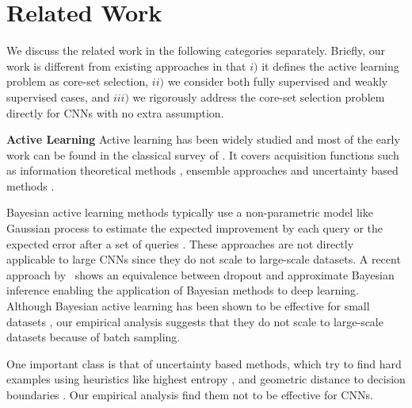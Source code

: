 \documentclass{article} \usepackage{iclr2018_conference,times}
\begin{document}
\section{Related Work} We discuss the related work in the following categories
separately. Briefly, our work is different from existing approaches in that $i)$
it defines the active learning problem as core-set selection, $ii)$ we consider
both fully supervised and weakly supervised cases, and $ iii)$ we rigorously
address the core-set selection problem directly for CNNs with no extra
assumption. 


\noindent\textbf{Active Learning} Active learning has been widely studied and
most of the early work can be found in the classical survey
of \citet{settles2010active}. It covers acquisition functions such as
information theoretical methods \citep{mackay1992information}, ensemble
approaches \citep{mccallumzy1998employing, freund1997selective} and uncertainty
based methods
\citep{tong2001support,joshi2009multi,li2013adaptive}.

Bayesian active learning methods typically use a non-parametric model like
Gaussian process to estimate the expected improvement by each query
\citep{kapoor2007active} or the expected error after a set of queries
\citep{roy2001toward}. These approaches are not directly applicable to large CNNs since they do not scale to large-scale datasets. A recent approach by~\citet{gal_bayes} shows an equivalence between dropout and approximate
Bayesian inference enabling the application of Bayesian methods to deep
learning. Although Bayesian active learning has been shown to be effective
for small datasets \citep{gal_active}, our empirical analysis suggests that they do not scale to large-scale datasets because of batch sampling.

One important class is that of uncertainty based methods, which try to find hard
examples using heuristics like highest entropy \citep{joshi2009multi}, and
geometric distance to decision boundaries
\citep{tong2001support,brinker2003incorporating}. Our empirical analysis find them not to be effective for CNNs.
\end{document}
